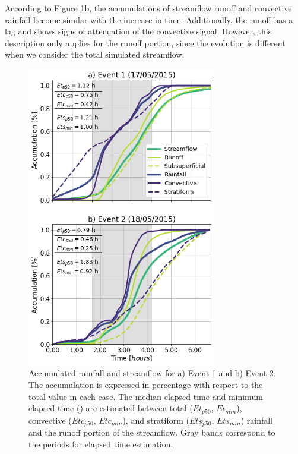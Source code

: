 \documentclass[hess, manuscript]{copernicus}
\begin{document}
According to Figure \ref{fig:lluviaElapsedCaudal}b, the accumulations of streamflow runoff and convective rainfall become similar with the increase in time. Additionally, the runoff has a lag and shows signs of attenuation of the convective signal.  However, this description only applies for the runoff portion, since the evolution is different when we consider the total simulated streamflow.\\


\begin{figure}[t]
\centering
 \includegraphics[width=8.3cm]{Figures/Rain_Streamflow_Elapsed.png}
 \caption{Accumulated rainfall and streamflow for a) Event 1 and b) Event 2. The accumulation is expressed in percentage with respect to the total value in each case. The median elapsed time and minimum elapsed time () are estimated between total ($Et_{p50}$, $Et_{min}$), convective ($Etc_{p50}$, $Etc_{min}$), and stratiform ($Ets_{p50}$, $Ets_{min}$) rainfall and the runoff portion of the streamflow. Gray bands correspond to the periods for elapsed time estimation.}
    \label{fig:lluviaElapsedCaudal}
\end{figure}
\end{document}
